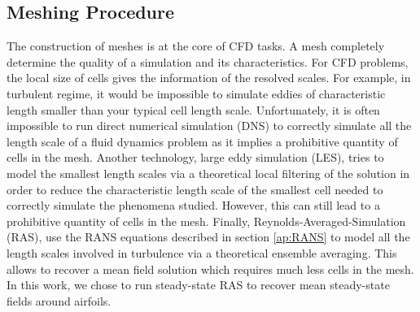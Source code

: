 \begin{subappendices}
	\section{Meshing Procedure}\label{ap:meshing}
	The construction of meshes is at the core of CFD tasks. A mesh completely determine the quality of a simulation and its characteristics. For CFD problems, the local size of cells gives the information of the resolved scales. For example, in turbulent regime, it would be impossible to simulate eddies of characteristic length smaller than your typical cell length scale. Unfortunately, it is often impossible to run direct numerical simulation (DNS) to correctly simulate all the length scale of a fluid dynamics problem as it implies a prohibitive quantity of cells in the mesh. Another technology, large eddy simulation (LES), tries to model the smallest length scales via a theoretical local filtering of the solution in order to reduce the characteristic length scale of the smallest cell needed to correctly simulate the phenomena studied. However, this can still lead to a prohibitive quantity of cells in the mesh. Finally, Reynolds-Averaged-Simulation (RAS), use the RANS equations described in section \ref{ap:RANS} to model all the length scales involved in turbulence via a theoretical ensemble averaging. This allows to recover a mean field solution which requires much less cells in the mesh. In this work, we chose to run steady-state RAS to recover mean steady-state fields around airfoils.
	

\end{subappendices}
